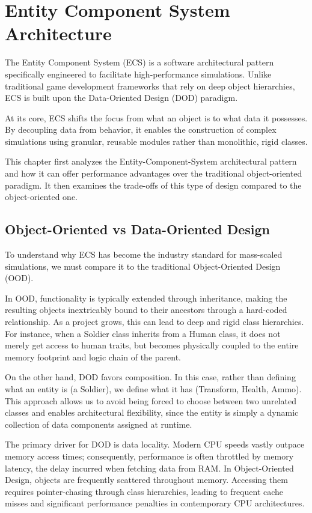 \chapter{Entity Component System Architecture}
\label{sec:secondChapter}

The Entity Component System (ECS) is a software architectural pattern specifically engineered to facilitate high-performance simulations. Unlike traditional game development frameworks that rely on deep object hierarchies, ECS is built upon the Data-Oriented Design (DOD) paradigm.

At its core, ECS shifts the focus from what an object is to what data it possesses. By decoupling data from behavior, it enables the construction of complex simulations using granular, reusable modules rather than monolithic, rigid classes.

This chapter first analyzes the Entity-Component-System architectural pattern and how it can offer performance advantages over the traditional object-oriented paradigm. It then examines the trade-offs of this type of design compared to the object-oriented one.
\section{Object-Oriented vs Data-Oriented Design} %

To understand why ECS has become the industry standard for mass-scaled simulations, we must compare it to the traditional Object-Oriented Design (OOD).

In OOD, functionality is typically extended through inheritance, making the resulting objects inextricably bound to their ancestors through a hard-coded relationship. As a project grows, this can lead to deep and rigid class hierarchies. For instance, when a Soldier class inherits from a Human class, it does not merely get access to human traits, but becomes physically coupled to the entire memory footprint and logic chain of the parent.

On the other hand, DOD favors composition. In this case, rather than defining what an entity is (a Soldier), we define what it has (Transform, Health, Ammo). This approach allows us to avoid being forced to choose between two unrelated classes and enables architectural flexibility, since the entity is simply a dynamic collection of data components assigned at runtime.

The primary driver for DOD is data locality. Modern CPU speeds vastly outpace memory access times; consequently, performance is often throttled by memory latency, the delay incurred when fetching data from RAM. In Object-Oriented Design, objects are frequently scattered throughout memory. Accessing them requires pointer-chasing through class hierarchies, leading to frequent cache misses and significant performance penalties in contemporary CPU architectures.

